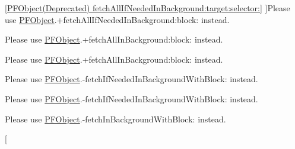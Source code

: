 \begin{DoxyRefList}
\hypertarget{deprecated__deprecated000024}{}%
\hyperlink{category_p_f_object_07_deprecated_08_aa783e119f260f5e8598abb0564359318}{\mbox{[}P\+F\+Object(Deprecated) fetch\+All\+If\+Needed\+In\+Background\+:target\+:selector\+:\mbox{]}} ]Please use {\ttfamily \hyperlink{interface_p_f_object}{P\+F\+Object}.+fetch\+All\+If\+Needed\+In\+Background\+:block\+:} instead.  
\item[\label{deprecated__deprecated000023}%
\hypertarget{deprecated__deprecated000023}{}%
\hyperlink{category_p_f_object_07_deprecated_08_ad503445a923bc28ce86b3540e99ad290}{\mbox{[}P\+F\+Object(Deprecated) fetch\+All\+In\+Background\+:target\+:selector\+:\mbox{]}} ]Please use {\ttfamily \hyperlink{interface_p_f_object}{P\+F\+Object}.+fetch\+All\+In\+Background\+:block\+:} instead.  
\item[\label{deprecated__deprecated000023}%
\hypertarget{deprecated__deprecated000023}{}%
\hyperlink{category_p_f_object_07_deprecated_08_ad503445a923bc28ce86b3540e99ad290}{\mbox{[}P\+F\+Object(Deprecated) fetch\+All\+In\+Background\+:target\+:selector\+:\mbox{]}} ]Please use {\ttfamily \hyperlink{interface_p_f_object}{P\+F\+Object}.+fetch\+All\+In\+Background\+:block\+:} instead.  
\item[\label{deprecated__deprecated000022}%
\hypertarget{deprecated__deprecated000022}{}%
\hyperlink{category_p_f_object_07_deprecated_08_acfcb1ff704744d8706dd63a5a17ca43a}{\mbox{[}P\+F\+Object(Deprecated) fetch\+If\+Needed\+In\+Background\+With\+Target\+:selector\+:\mbox{]}} ]Please use {\ttfamily \hyperlink{interface_p_f_object}{P\+F\+Object}.-\/fetch\+If\+Needed\+In\+Background\+With\+Block\+:} instead.  
\item[\label{deprecated__deprecated000022}%
\hypertarget{deprecated__deprecated000022}{}%
\hyperlink{category_p_f_object_07_deprecated_08_acfcb1ff704744d8706dd63a5a17ca43a}{\mbox{[}P\+F\+Object(Deprecated) fetch\+If\+Needed\+In\+Background\+With\+Target\+:selector\+:\mbox{]}} ]Please use {\ttfamily \hyperlink{interface_p_f_object}{P\+F\+Object}.-\/fetch\+If\+Needed\+In\+Background\+With\+Block\+:} instead.  
\item[\label{deprecated__deprecated000021}%
\hypertarget{deprecated__deprecated000021}{}%
\hyperlink{category_p_f_object_07_deprecated_08_af3eacaaeffebd4cc0ba339d765a50ade}{\mbox{[}P\+F\+Object(Deprecated) fetch\+In\+Background\+With\+Target\+:selector\+:\mbox{]}} ]Please use {\ttfamily \hyperlink{interface_p_f_object}{P\+F\+Object}.-\/fetch\+In\+Background\+With\+Block\+:} instead.  
\item[\label{deprecated__deprecated000021}%

\end{DoxyRefList}
